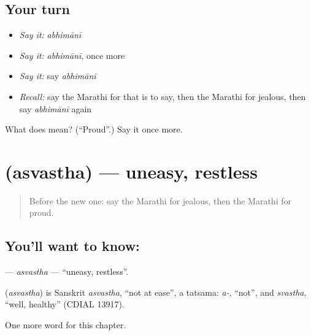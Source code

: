 \subsection*{Your turn}
\begin{itemize}
\raggedright
  \item \emph{Say it:} \emph{abhimānī}
  \item \emph{Say it:} \emph{abhimānī}, once more
  \item \emph{Say it:} say \emph{abhimānī}
  \item \emph{Recall:} say the Marathi for that is to say, then the Marathi for jealous, then say \emph{abhimānī} again
\end{itemize}

\begin{tcolorbox}[breakable,colback=teal!4,colframe=teal!35!black,title={Before you move on}]
What does  mean? (\textquotedblleft{}Proud\textquotedblright{}.) Say it once more.
\end{tcolorbox}
\section[\texorpdfstring{\mr{अस्वस्थ} (asvastha)}{अस्वस्थ (asvastha)}]{ (asvastha) — uneasy, restless}

\label{lesson:MR-C232-asvastha}



\begin{quote}
Before the new one: say the Marathi for jealous, then the Marathi for proud.
\end{quote}

\subsection*{You'll want to know: }
\textbf{} — \emph{asvastha} — \textquotedblleft{}uneasy, restless\textquotedblright{}.

\begin{cousinweb}
\textbf{} (\emph{asvastha}) is Sanskrit \emph{asvastha}, \textquotedblleft{}not at ease\textquotedblright{}, a tatsama: \emph{a-}, \textquotedblleft{}not\textquotedblright{}, and \emph{svastha}, \textquotedblleft{}well, healthy\textquotedblright{} (CDIAL 13917).
\end{cousinweb}

\begin{grammarlens}[title={What you've built}]
One more word for this chapter.
\end{grammarlens}

